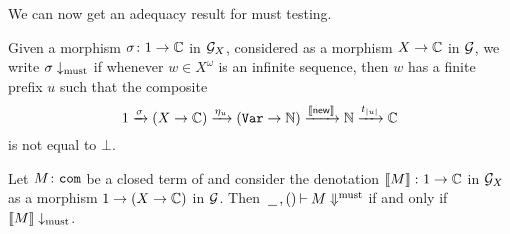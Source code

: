 We can now get an adequacy result for must testing.

\begin{definition}
  Given a morphism $\sigma\colon 1\to\mathbb{C}$ in $\mathcal G_X$, considered as a morphism $X \to \mathbb{C}$ in $\mathcal G$, we write $\sigma\downarrow_{\operatorname{must}}$ if whenever $w\in X^\omega$ is an infinite sequence, then $w$ has a finite prefix $u$ such that the composite
  \[
    1 \xrightarrow{\sigma}
    (X \to \mathbb{C}) \xrightarrow{\eta_u}
    ({\mathtt{Var}} \to \mathbb{N}) \xrightarrow{\left\llbracket\operatorname{{\mathsf{new}}}\right\rrbracket}
    \mathbb{N} \xrightarrow{t_{|u|}}
    \mathbb{C}
    \]
  is not equal to $\bot$.
  \label{DefDenoMust}
\end{definition}

\begin{corollary}
  Let $M\colon {\mathtt{com}}$ be a closed term of \IAX and consider the denotation $\left\llbracket M\right\rrbracket \colon 1 \to \mathbb{C}$ in $\mathcal G_X$ as a morphism $1 \to (X \to \mathbb{C})$ in $\mathcal G$.
  Then $\,\underline{\hspace{1.5ex}}\,,()\mathbin{\vdash} M\Downarrow^{\text{must}}$ if and only if $\left\llbracket M\right\rrbracket\downarrow_{\operatorname{must}}$.
  \label{CorAdeqMust}
\end{corollary}

